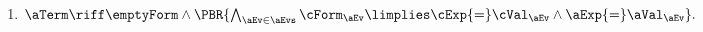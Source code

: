 \begin{definition}
\begin{multicols}{2}
\begin{enumerate}[topsep=0pt,label=(\textsc{w}\arabic*),ref=\textsc{w}\arabic*]
    \item \label {write-term-ca-addr}
      \begin{math}
        \aTerm \riff
        \emptyForm
        \land
        \PBR{\bigwedge_{\aEv\in\aEvs}\cForm_\aEv \limplies \cExp{=}\cVal_\aEv \land\aExp{=}\aVal_\aEv}.
      \end{math}
    \end{enumerate}
  \end{multicols}


\end{definition}
